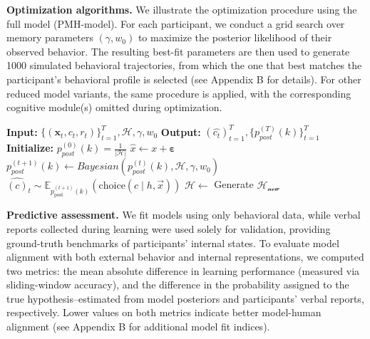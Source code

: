 \textbf{Optimization algorithms.}
We illustrate the optimization procedure using the full model (PMH-model). For each participant, we conduct a grid search over memory parameters $(\gamma, w_0)$ to maximize the posterior likelihood of their observed behavior. The resulting best-fit parameters are then used to generate 1000 simulated behavioral trajectories, from which the one that best matches the participant’s behavioral profile is selected (see Appendix B for details). For other reduced model variants, the same procedure is applied, with the corresponding cognitive module(s) omitted during optimization.

\begin{algorithm}
\caption{$PH_0M_0$ Model}
\begin{algorithmic}[1]
\Statex \textbf{Input:} $\bigl\{(\mathbf x_t,c_t,r_t)\bigr\}_{t=1}^{T},\mathcal{H},\gamma,w_0$
\Statex \textbf{Output:} ${(\hat{c_t})_{t=1}^T}, \bigr\{p_{post}^{(T)}(k)\bigr\}_{t=1}^T$
\Statex \textbf{Initialize:} $p_{post}^{(0)}(k) = \frac{1}{\left |\mathcal{H} \right |}$
    \State $\hat{x} \gets x + \boldsymbol\varepsilon$
    \State $p_{post}^{(t+1)}(k)\gets Bayesian(p_{post}^{(t)}(k),\mathcal{H},\gamma,w_0)$
    \State $\hat{(c)}_{t} \sim \mathbb{E}_{p_{\text{post}}^{(t+1)}(k)} \left( \text{choice}(c \mid h,\vec{x}) \right)$
    \State $\mathcal{H} \gets$ Generate $\mathcal{H_{\text{new}}}$
\EndFor
\end{algorithmic}
\end{algorithm}

\textbf{Predictive assessment.}
We fit models using only behavioral data, while verbal reports collected during learning were used solely for validation, providing ground-truth benchmarks of participants’ internal states. To evaluate model alignment with both external behavior and internal representations, we computed two metrics: the mean absolute difference in learning performance (measured via sliding-window accuracy), and the difference in the probability assigned to the true hypothesis--estimated from model posteriors and participants’ verbal reports, respectively. Lower values on both metrics indicate better model-human alignment (see Appendix B for additional model fit indices).

